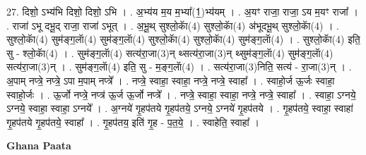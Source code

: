 \documentclass[17pt]{extarticle}
\begin{document}
27. दिशो॒ ऽभ्य॑भि दिशो॒ दिशो॒ ऽभि । . अ॒भ्य॑य म॒य म॒भ्या᳚(1॒)भ्य॑यम् । . अ॒यꣳ राजा॒ राजा॒ ऽय म॒यꣳ राजा᳚ । . राजा॑ ऽभू दभू॒द् राजा॒ राजा॑ ऽभूत् । . अ॒भू॒थ् सुश्लो॒काॅ(4) सुश्लो॒काॅ(4) अ॑भूदभू॒थ् सुश्लो॒काॅ(4) । . सुश्लो॒काॅ(4) सुम॑ङ्ग॒लाॅ(4) सुम॑ङ्ग॒लाॅ(4) सुश्लो॒काॅ(4) सुश्लो॒काॅ(4) सुम॑ङ्ग॒लाॅ(4) । . सुश्लो॒काॅ(4) इति॒ सु - श्लो॒काॅ(4) । . सुम॑ङ्ग॒लाॅ(4) सत्य॑रा॒जा(3)न् थ्सत्य॑रा॒जा(3)न् थ्सुम॑ङ्ग॒लाॅ(4) सुम॑ङ्ग॒लाॅ(4) सत्य॑रा॒जा(3)न् । . सुम॑ङ्ग॒लाॅ(4) इति॒ सु - म॒ङ्ग॒लाॅ(4) । . सत्य॑रा॒जा(3)निति॒ सत्य॑ - रा॒जा(3)न् । . अ॒पाम् नप्त्रे॒ नप्त्रे॒ ऽपा म॒पाम् नप्त्रे᳚ । . नप्त्रे॒ स्वाहा॒ स्वाहा॒ नप्त्रे॒ नप्त्रे॒ स्वाहा᳚ । . स्वाहो॒र्ज ऊ॒र्जः स्वाहा॒ स्वाहो॒र्जः । . ऊ॒र्जो नप्त्रे॒ नप्त्र॑ ऊ॒र्ज ऊ॒र्जो नप्त्रे᳚ । . नप्त्रे॒ स्वाहा॒ स्वाहा॒ नप्त्रे॒ नप्त्रे॒ स्वाहा᳚ । . स्वाहा॒ ऽग्नये॒ ऽग्नये॒ स्वाहा॒ स्वाहा॒ ऽग्नये᳚ । . अ॒ग्नये॑ गृ॒हप॑तये गृ॒हप॑तये॒ ऽग्नये॒ ऽग्नये॑ गृ॒हप॑तये । . गृ॒हप॑तये॒ स्वाहा॒ स्वाहा॑ गृ॒हप॑तये गृ॒हप॑तये॒ स्वाहा᳚ । . गृ॒हप॑तय॒ इति॑ गृ॒ह - प॒त॒ये॒ । . स्वाहेति॒ स्वाहा᳚ । \newline

\textbf{Ghana Paata } \newline
\end{document}
